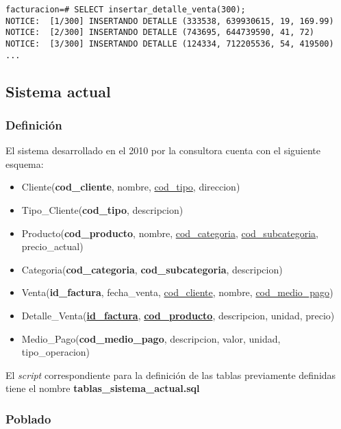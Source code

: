 \vspace*{5mm}
\begin{lstlisting}[title=Inserción de 300 detalles de ventas aleatorias en la BD]
facturacion=# SELECT insertar_detalle_venta(300);
NOTICE:  [1/300] INSERTANDO DETALLE (333538, 639930615, 19, 169.99)
NOTICE:  [2/300] INSERTANDO DETALLE (743695, 644739590, 41, 72)
NOTICE:  [3/300] INSERTANDO DETALLE (124334, 712205536, 54, 419500)
...
\end{lstlisting}

\subsection{Sistema actual}

\subsubsection{Definición}

El sistema desarrollado en el 2010 por la consultora cuenta con el siguiente esquema:

\begin{itemize}
    \item Cliente(\textbf{cod\_cliente}, nombre, \underline{cod\_tipo}, direccion)
    \item Tipo\_Cliente(\textbf{cod\_tipo}, descripcion)
    \item Producto(\textbf{cod\_producto}, nombre, \underline{cod\_categoria}, \underline{cod\_subcategoria}, precio\_actual)
    \item Categoria(\textbf{cod\_categoria}, \textbf{cod\_subcategoria}, descripcion)
    \item Venta(\textbf{id\_factura}, fecha\_venta, \underline{cod\_cliente}, nombre, \underline{cod\_medio\_pago})
    \item Detalle\_Venta(\underline{\textbf{id\_factura}}, \underline{\textbf{cod\_producto}}, descripcion, unidad, precio)
    \item Medio\_Pago(\textbf{cod\_medio\_pago}, descripcion, valor, unidad, tipo\_operacion)
\end{itemize}

El \emph{script} correspondiente para la definición de las tablas previamente definidas tiene el nombre \textbf{tablas\_sistema\_actual.sql} 

\subsubsection{Poblado}

